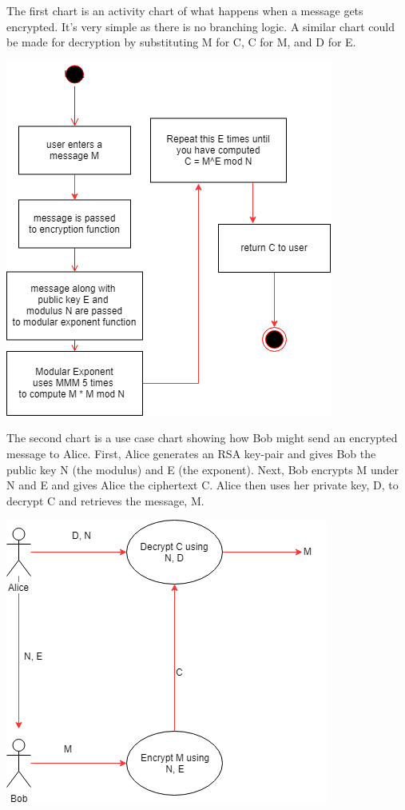 \documentclass[12pt]{article}
\begin{document}
\clearpage

The first chart is an activity chart of what happens when a message gets encrypted. It's very simple as there is no branching logic. A similar chart could be made for decryption by substituting M for C, C for M, and D for E.

\includegraphics[scale=1]{UML1}

\clearpage

The second chart is a use case chart showing how Bob might send an encrypted message to Alice. First, Alice generates an RSA key-pair and gives Bob the public key N (the modulus) and E (the exponent). Next, Bob encrypts M under N and E and gives Alice the ciphertext C. Alice then uses her private key, D, to decrypt C and retrieves the message, M.

\includegraphics[scale=1]{UML2.png}
\end{document}

